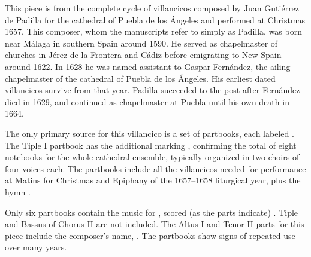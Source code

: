 
\begin{notesources}

    \begin{source}
    \end{source}

    \begin{source}
    \end{source}

\end{notesources}

This piece is from the complete cycle of villancicos composed by Juan Gutiérrez 
de Padilla for the cathedral of Puebla de los Ángeles and performed at 
Christmas 1657.%
    \Autocite[133--226]{Cashner:PhD}
This composer, whom the manuscripts refer to simply as Padilla, was born near
Málaga in southern Spain around 1590.%
    \Autocites{Mauleon:PadillaPalafox}{Hurtado:Padilla}{Stevenson:Padilla}
He served as chapelmaster of churches in Jérez de la Frontera and Cádiz before
emigrating to New Spain around 1622.
In 1628 he was named assistant to Gaspar Fernández, the ailing chapelmaster of
the cathedral of Puebla de los Ángeles.
His earliest dated villancicos survive from that year.%
    \Autocite{Cashner:Cards}
Padilla succeeded to the post after Fernández died in 1629, and continued as
chapelmaster at Puebla until his own death in 1664.

The only primary source for this villancico is a set of partbooks, each labeled
.
  \Autocites{Puebla:Microfilm}{Stanford:Catalog}
The Tiple I partbook has the additional marking , 
confirming the total of eight notebooks for the whole cathedral ensemble, 
typically organized in two choirs of four voices each.
The partbooks include all the villancicos needed for performance at Matins for 
Christmas and Epiphany of the 1657--1658 liturgical year, plus the hymn 
.

Only six partbooks contain the music for , 
scored (as the parts indicate) .
Tiple and Bassus of Chorus II are not included.
The Altus I and Tenor II parts for this piece include the composer's name, 
.
The partbooks show signs of repeated use over many years.

